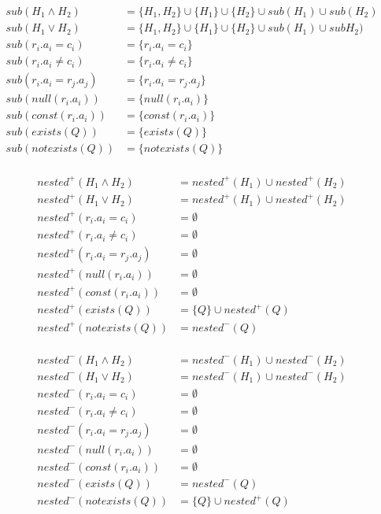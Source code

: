 \begin{mydef}
	
	\begin{align*}
		sub(H_1\land H_2) & = \{H_1,H_2\} \cup \{H_1\} \cup \{H_2\} \cup sub(H_1) \cup sub(H_2) \\
		sub(H_1\lor H_2) & = \{H_1,H_2\} \cup \{H_1\} \cup \{H_2\} \cup sub(H_1) \cup subH_2) \\
		sub(r_i.a_i = c_i) & = \{r_i.a_i = c_i\} \\
		sub(r_i.a_i \neq c_i) & = \{r_i.a_i \neq c_i\} \\
		sub(r_i.a_i = r_j.a_j) & = \{r_i.a_i = r_j.a_j\} \\
		sub(null(r_i.a_i)) & = \{null(r_i.a_i)\} \\
		sub(const(r_i.a_i)) & = \{const(r_i.a_i)\} \\
		sub(exists(Q)) & = \{exists(Q)\} \\
		sub(notexists(Q)) & = \{notexists(Q)\} \\
	\end{align*}
	
	\begin{align*}
		nested^+(H_1\land H_2) & = nested^+(H_1) \cup nested^+(H_2) \\
		nested^+(H_1\lor H_2) & =  nested^+(H_1) \cup nested^+(H_2) \\
		nested^+(r_i.a_i = c_i) & =  \emptyset \\
		nested^+(r_i.a_i \neq c_i) & =  \emptyset \\
		nested^+(r_i.a_i = r_j.a_j) & =  \emptyset \\
		nested^+(null(r_i.a_i)) & =  \emptyset \\
		nested^+(const(r_i.a_i)) & =  \emptyset \\
		nested^+(exists(Q)) & = \{Q\} \cup nested^+(Q) \\
		nested^+(notexists(Q)) & = nested^-(Q) \\
	\end{align*}
	
	\begin{align*}
		nested^-(H_1\land H_2) & =nested^-(H_1) \cup nested^-(H_2) \\
		nested^-(H_1\lor H_2) & =  nested^-(H_1) \cup nested^-(H_2) \\
		nested^-(r_i.a_i = c_i) & = \emptyset \\
		nested^-(r_i.a_i \neq c_i) & = \emptyset \\
		nested^-(r_i.a_i = r_j.a_j) & = \emptyset \\
		nested^-(null(r_i.a_i)) & = \emptyset \\
		nested^-(const(r_i.a_i)) & = \emptyset \\
		nested^-(exists(Q)) & = nested^-(Q) \\
		nested^-(notexists(Q)) & = \{Q\} \cup nested^+(Q) \\
	\end{align*}
	

\end{mydef}
